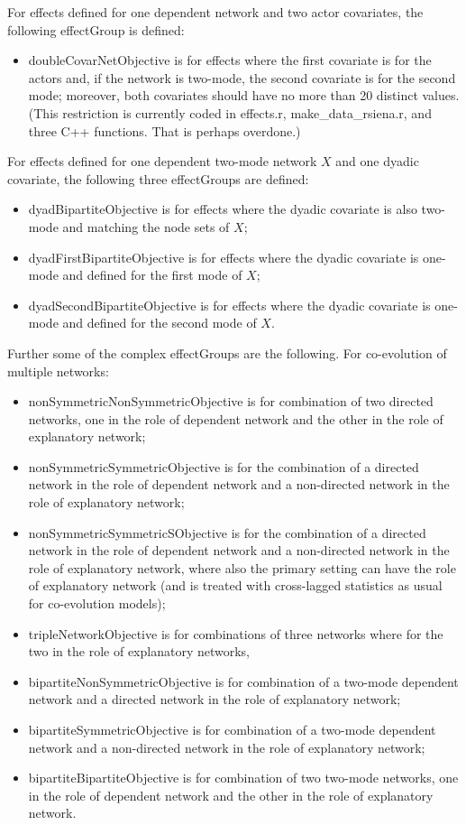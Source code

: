 \documentclass[a4paper,fleqn,11pt]{article}
\newcommand{\+}{\, + \,}
\newcommand{\sfn}[1]{\textsf{#1}}
\begin{document}
For effects defined for one dependent network and two actor covariates,
the following effectGroup is defined:
\begin{itemize}
\item \sfn{doubleCovarNetObjective} is for effects where the
    first covariate is for the actors and, if the network is two-mode,
    the second covariate is for the second mode;
    moreover, both covariates should have no more than
    20 distinct values. (This restriction is currently
    coded in \sfn{effects.r}, \sfn{make\_data\_rsiena.r},
    and three C++ functions. That is perhaps overdone.)
\end{itemize}
For effects defined for one dependent two-mode network $X$ and one dyadic
covariate, the following three effectGroups are defined:
\begin{itemize}
\item \sfn{dyadBipartiteObjective} is for effects where the dyadic covariate is
    also two-mode and matching the node sets of $X$;
\item \sfn{dyadFirstBipartiteObjective} is for effects where the dyadic
    covariate is one-mode and defined for the first mode of $X$;
\item \sfn{dyadSecondBipartiteObjective} is for effects where the dyadic
    covariate is one-mode and defined for the second mode of $X$.
\end{itemize}
\medskip

Further some of the complex effectGroups are the following.
For co-evolution of multiple networks:
\begin{itemize}
\item \sfn{nonSymmetricNonSymmetricObjective} is for combination of two
    directed networks, one in the role of dependent network and the other
    in the role of explanatory network;
\item \sfn{nonSymmetricSymmetricObjective} is for the combination of a
    directed network in the role of dependent network and a non-directed network
    in the role of explanatory network;
\item \sfn{nonSymmetricSymmetricSObjective} is for the combination of a
    directed network in the role of dependent network and a non-directed network
    in the role of explanatory network, where also the primary setting
    can have the role of explanatory network (and is treated with cross-lagged
    statistics as usual for co-evolution models);
\item \sfn{tripleNetworkObjective} is for combinations
    of three networks where for the two in the role of explanatory networks,
\item \sfn{bipartiteNonSymmetricObjective} is for combination of
    a two-mode dependent network and a directed network
    in the role of explanatory network;
\item \sfn{bipartiteSymmetricObjective} is for combination of
    a two-mode dependent network and a non-directed network
    in the role of explanatory network;
\item \sfn{bipartiteBipartiteObjective} is for combination of two
    two-mode networks, one in the role of dependent network and the other
    in the role of explanatory network.
\end{itemize}
\medskip
\end{document}
